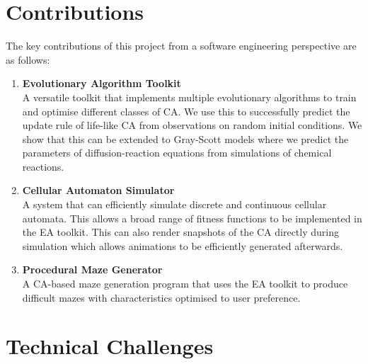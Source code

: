 \section{Contributions}
The key contributions of this project from a software engineering perspective are as follows:
\begin{enumerate}
    \item \textbf{Evolutionary Algorithm Toolkit}\\ A versatile toolkit that implements multiple evolutionary algorithms to train and optimise different classes of CA. We use this to successfully predict the update rule of life-like CA from observations on random initial conditions. We show that this can be extended to Gray-Scott models where we predict the parameters of diffusion-reaction equations from simulations of chemical reactions.
    \item \textbf{Cellular Automaton Simulator}\\ A system that can efficiently simulate discrete and continuous cellular automata. This allows a broad range of fitness functions to be implemented in the EA toolkit. This can also render snapshots of the CA directly during simulation which allows animations to be efficiently generated afterwards.
    \item \textbf{Procedural Maze Generator}\\ A CA-based maze generation program that uses the EA toolkit to produce difficult mazes with characteristics optimised to user preference.
    
\end{enumerate}
\section{Technical Challenges}